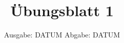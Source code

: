 

\subject{Computional Physics 2023}
\title{Übungsblatt 1}
\date{%
  Ausgabe: DATUM
  \hspace{3em}
  Abgabe: DATUM
}



\maketitle
\thispagestyle{empty}
\tableofcontents
\newpage





 


